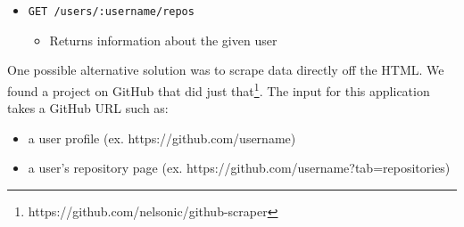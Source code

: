 \documentclass[11pt]{article}
\begin{document}
\begin{itemize}
\begin{itemize}
{{			  \textcolor{r}{"type"}: \textcolor{b}{"User"},\\
			  \textcolor{r}{"site\_admin"}: \textcolor{b}{false},\\
			  \textcolor{r}{"name"}: \textcolor{b}{"monalisa octocat"},\\
			  \textcolor{r}{"company"}: \textcolor{b}{"GitHub"},\\
			  \textcolor{r}{"blog"}: \textcolor{b}{"https://github.com/blog"},\\
			  \textcolor{r}{"location"}: \textcolor{b}{"San Francisco"},\\
			  \textcolor{r}{"email"}: \textcolor{b}{"octocat@github.com"},\\
			  \textcolor{r}{"hireable"}: \textcolor{b}{false},\\
			  \textcolor{r}{"bio"}: \textcolor{b}{"There once was..."},\\
			  \textcolor{r}{"public\_repos"}: \textcolor{b}{2},\\
			  \textcolor{r}{"public\_gists"}: \textcolor{b}{1},\\
			  \textcolor{r}{"followers"}: \textcolor{b}{20},\\
			  \textcolor{r}{"following"}: \textcolor{b}{0},\\
			  \textcolor{r}{"created\_at"}: \textcolor{b}{"2008-01-14T04:33:35Z"},\\
			  \textcolor{r}{"updated\_at"}: "\textcolor{b}{2008-01-14T04:33:35Z"}\\
			}
		\}
   	   }
	\end{itemize}
   \item{\texttt{GET /users/:username/repos}}
	\begin{itemize}
	   \item{Returns information about the given user}
	\end{itemize}
\end{itemize}

One possible alternative solution was to scrape data directly off the HTML. We found a project on GitHub that did just that\footnote{https://github.com/nelsonic/github-scraper}. The input for this application takes a GitHub URL such as:
\begin{itemize}
\item{a user profile (ex. https://github.com/username)}
\item{a user's repository page (ex. https://github.com/username?tab=repositories)}
\end{itemize}
\end{document}
